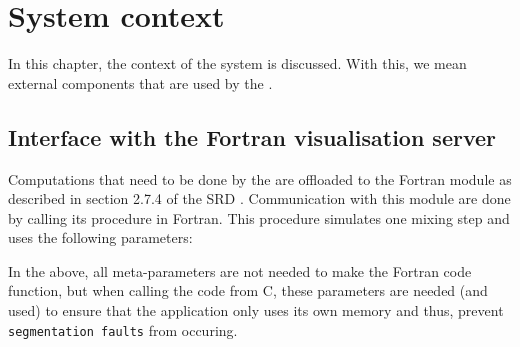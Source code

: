 \chapter{System context}
\label{chap:systcontext}
In this chapter, the context of the system is discussed. With this, we mean external components that are used by the \applicationname{}.

\section{Interface with the Fortran visualisation server}
Computations that need to be done by the \applicationname{} are offloaded to the Fortran module as described in section 2.7.4 of the SRD \cite{srd}. Communication with this module are done by calling its procedure in Fortran. This procedure simulates one mixing step and uses the following parameters:

\begin{center}
\end{center}

\noindent In the above, all meta-parameters are not needed to make the Fortran code function, but when calling the code from C, these parameters are needed (and used) to ensure that the application only uses its own memory and thus, prevent \texttt{segmentation faults} from occuring.